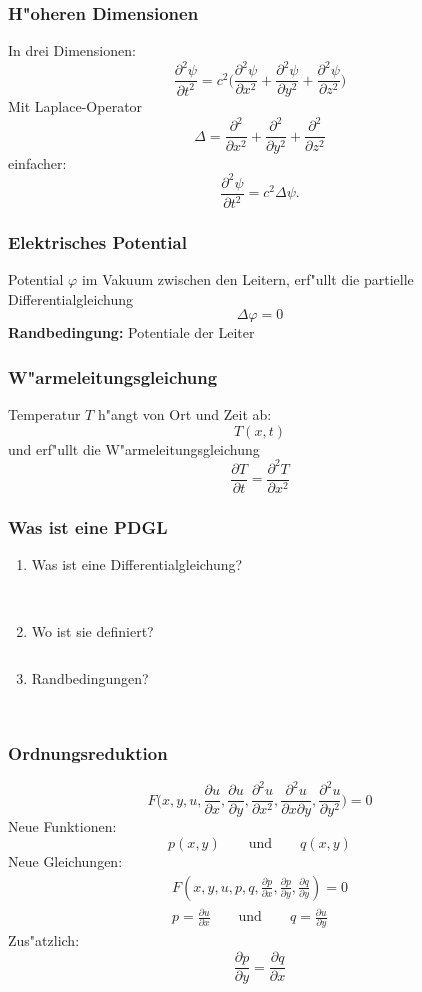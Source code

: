 \documentclass{beamer}
\begin{document}
\begin{frame}
\frametitle{H"oheren Dimensionen}
In drei Dimensionen:
\[
\frac{\partial^2\psi}{\partial t^2}=c^2
\biggl(
\frac{\partial^2\psi}{\partial x^2}
+
\frac{\partial^2\psi}{\partial y^2}
+
\frac{\partial^2\psi}{\partial z^2}
\biggr)
\]
\pause
Mit Laplace-Operator
\[
\Delta
=
\frac{\partial^2}{\partial x^2}
+
\frac{\partial^2}{\partial y^2}
+
\frac{\partial^2}{\partial z^2}
\]
\pause
einfacher:
\[
\frac{\partial^2\psi}{\partial t^2}
=
c^2\Delta \psi.
\]
\end{frame}


\begin{frame}
\frametitle{Elektrisches Potential}
Potential 
$\varphi$ 
im Vakuum zwischen den Leitern,
\pause
erf"ullt die partielle Differentialgleichung
\[
\Delta \varphi =0
\]
\pause
{\bf Randbedingung:} Potentiale der Leiter
\end{frame}

\begin{frame}
\frametitle{W"armeleitungsgleichung}
Temperatur $T$ h"angt von Ort und Zeit ab:
\[
T(x,t)
\]
\pause
und erf"ullt die W"armeleitungsgleichung
\[
\frac{\partial T}{\partial t}=\frac{\partial^2T}{\partial x^2}
\]
\end{frame}

\begin{frame}
\frametitle{Was ist eine PDGL}
\begin{enumerate}
\item Was ist eine Differentialgleichung?
\[
\phantom{
F( x_1,\dots,x_n,u,p_1, \dots,p_n) =0,\quad p_i=\frac{\partial u}{\partial x_i}
}
\]
\item Wo ist sie definiert?
\[
\phantom{
\text{Gebiet $\Omega$, d.~h.~offen}
}
\]
\item Randbedingungen?
\[
\phantom{
\text{$u(x)=g(x)$ oder $\frac{\partial u}{\partial n}=g(x)$ auf
$\partial\Omega$}
}
\]
\end{enumerate}
\end{frame}

\begin{frame}
\frametitle{Ordnungsreduktion}
\[
F\biggl(x,y,u,
\frac{\partial u}{\partial x},
\frac{\partial u}{\partial y},
\frac{\partial^2 u}{\partial x^2},
\frac{\partial^2 u}{\partial x\partial y},
\frac{\partial^2 u}{\partial y^2}
\biggr)=0
\]
\pause
Neue Funktionen:
\[
p(x,y)\qquad\text{und}\qquad q(x,y)
\]
\pause
Neue Gleichungen:
\begin{gather*}
F(x,y,u,p,q,\frac{\partial p}{\partial x},\frac{\partial p}{\partial y},
\frac{\partial q}{\partial y})=0
\\
p=\frac{\partial u}{\partial x}\qquad\text{und}\qquad
q=\frac{\partial u}{\partial y}
\end{gather*}
\pause
Zus"atzlich:
\[
\frac{\partial p}{\partial y}=\frac{\partial q}{\partial x}
\]
\end{frame}
\end{document}

